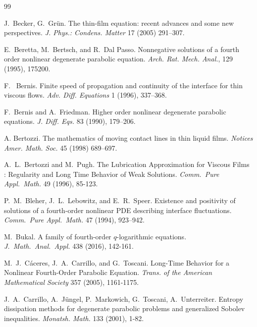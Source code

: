 \documentclass[12pt]{amsart}
\theoremstyle{plain}
\theoremstyle{definition}
\theoremstyle{remark}
\begin{document}
\begin{thebibliography}{99}

J.~Becker, G.~Grün. The thin-film equation: recent advances and some new perspectives. {\em J. Phys.: Condens. Matter} 17 (2005) 291–307.

 E.~Beretta, M.~Bertsch, and R.~Dal Passo. Nonnegative solutions of a fourth order nonlinear degenerate parabolic equation. {\em Arch. Rat. Mech. Anal.}, 129 (1995), 175200.

 F.~ Bernis. Finite speed of propagation and continuity of the interface for thin viscous flows. {\em Adv. Diff. Equations} 1 (1996), 337--368.

 F.~Bernis and A.~Friedman.
		Higher order nonlinear degenerate parabolic equations.
		{\em J. Diff. Eqs.} 83 (1990), 179--206.

A. Bertozzi. The mathematics of moving contact lines in thin liquid films. {\em Notices Amer. Math. Soc.} 45 (1998) 689–697.

 A.~L.~Bertozzi and  M.~Pugh. The Lubrication
		Approximation for Viscous Films : Regularity and Long Time
		Behavior of Weak Solutions. {\em Comm.~Pure Appl.~Math.} 49 (1996), 85-123.

 P.~M.~Bleher, J.~L.~Lebowitz, and E.~R.~Speer. Existence and positivity of solutions of a fourth-order nonlinear PDE describing interface fluctuations. {\em Comm.~Pure Appl.~Math.} 47 (1994), 923–942.

 M.~Bukal. A family of fourth-order $q$-logarithmic equations. {\em J.~Math.~Anal.~Appl.} 438 (2016), 142-161.



M.~J.~C\'aceres, J.~A.~Carrillo, and G.~Toscani. 
Long-Time Behavior for a Nonlinear Fourth-Order Parabolic Equation. {\em Trans. of the American Mathematical Society} 357 (2005), 1161-1175.

 J.~A.~Carrillo, A.~J\"ungel, P.~Markowich, G.~Toscani, A.~Unterreiter. Entropy dissipation methods for degenerate parabolic problems and generalized Sobolev inequalities. {\em Monatsh. Math.} 133 (2001), 1-82.


\end{thebibliography}
\end{document}
